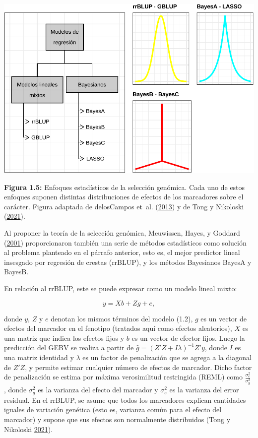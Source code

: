 \documentclass[11pt,spanish,a4paper,oneside,]{book} %
\begin{document}
\begin{center}\includegraphics[width=1\linewidth]{figures/Mod_GS} \end{center}

\begin{center}
\textbf{Figura 1.5:} Enfoques estadísticos de la selección genómica. Cada uno de estos enfoques suponen distintas distribuciones de efectos de los marcadores sobre el carácter. Figura adaptada de delosCampos et~al. (\protect\hyperlink{ref-cite:31}{2013}) y de Tong y Nikoloski (\protect\hyperlink{ref-cite:7}{2021}).

\end{center}

Al proponer la teoría de la selección genómica, Meuwissen, Hayes, y Goddard (\protect\hyperlink{ref-cite:8}{2001}) proporcionaron también una serie de métodos estadísticos como solución al problema planteado en el párrafo anterior, esto es, el mejor predictor lineal insesgado por regresión de crestas (rrBLUP), y los métodos Bayesianos BayesA y BayesB.

En relación al rrBLUP, este se puede expresar como un modelo lineal mixto:

\begin{equation}
y = Xb + Zg + e,
\end{equation}

donde \(y\), \(Z\) y \(e\) denotan los mismos términos del modelo (1.2), \(g\) es un vector de efectos del marcador en el fenotipo (tratados aquí como efectos aleatorios), \(X\) es una matriz que indica los efectos fijos y \(b\) es un vector de efector fijos. Luego la predicción del GEBV se realiza a partir de \(\hat{g} = (Z'Z + I \lambda)^{- 1} Z'y\), donde \(I\) es una matriz identidad y \(\lambda\) es un factor de penalización que se agrega a la diagonal de \(Z'Z\), y permite estimar cualquier número de efectos de marcador. Dicho factor de penalización se estima por máxima verosimilitud restringida (REML) como \(\frac{\sigma^{2}_{e}} {\sigma^{2}_{g}}\) , donde \(\sigma^{2}_{g}\) es la varianza del efecto del marcador y \(\sigma^{2}_{e}\) es la varianza del error residual. En el rrBLUP, se asume que todos los marcadores explican cantidades iguales de variación genética (esto es, varianza común para el efecto del marcador) y supone que sus efectos son normalmente distribuidos (Tong y Nikoloski \protect\hyperlink{ref-cite:7}{2021}).
\end{document}
